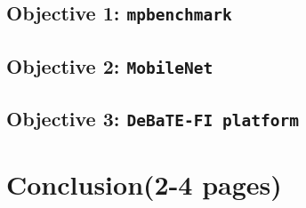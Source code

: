 \documentclass[12pt]{article}
\begin{document}
\subsection{Objective 1: \texttt{mpbenchmark}}
\subsection{Objective 2: \texttt{MobileNet}}
\subsection{Objective 3: \texttt{DeBaTE-FI platform}}

\section{Conclusion(2-4 pages)}





\begin{appendices}
	
\end{appendices}
\end{document}
